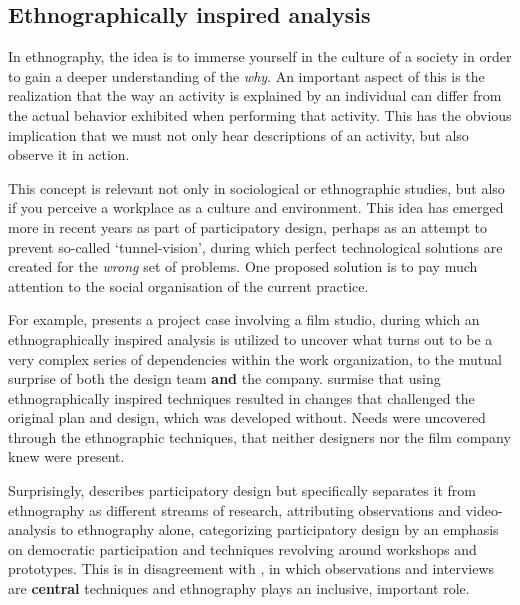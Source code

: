 \subsection{Ethnographically inspired analysis}
In ethnography, the idea is to immerse yourself in the culture of a
society in order to gain a deeper understanding of the \textit{why}. An
important aspect of this is the realization that the way an activity is explained by an
individual can differ from the actual behavior exhibited when performing that
activity. This has the obvious implication that we must not only hear
descriptions of an activity, but also observe it in action\cite{simonsen1997using}.

This concept is relevant not only in sociological or ethnographic studies, but also if
you perceive a workplace as a culture and environment. This idea has emerged more in recent
years as part of participatory design\cite{crabtree1998ethnography}, perhaps as an attempt to
prevent so-called `tunnel-vision', during which perfect technological solutions are created for
the \textit{wrong} set of problems\cite{sol1984prototyping}. One proposed solution is to pay much
attention to the social organisation of the current 
practice\cite{hughes1994moving, crabtree1998ethnography, simonsen1997using, bodker2004participatory}.

For example, \cite{simonsen1997using} presents a project case involving a film
studio, during which an ethnographically inspired analysis is utilized to
uncover what turns out to be a very complex series of dependencies within the
work organization, to the mutual surprise of both the design team \textbf{and}
the company. \cite{simonsen1997using} surmise that using ethnographically inspired techniques
resulted in changes that challenged the original plan and design, which was developed without.
Needs were uncovered through the ethnographic techniques, that neither designers nor
the film company knew were present.

Surprisingly, \cite{kujala2003user} describes participatory design but specifically separates it from
ethnography as different streams of research, attributing observations and video-analysis to ethnography 
alone, categorizing participatory design by an emphasis on democratic participation and techniques revolving 
around workshops and prototypes. This is in disagreement with \cite{bodker204participatory}, in which
observations and interviews are \textbf{central} techniques and ethnography plays an inclusive, important role.

